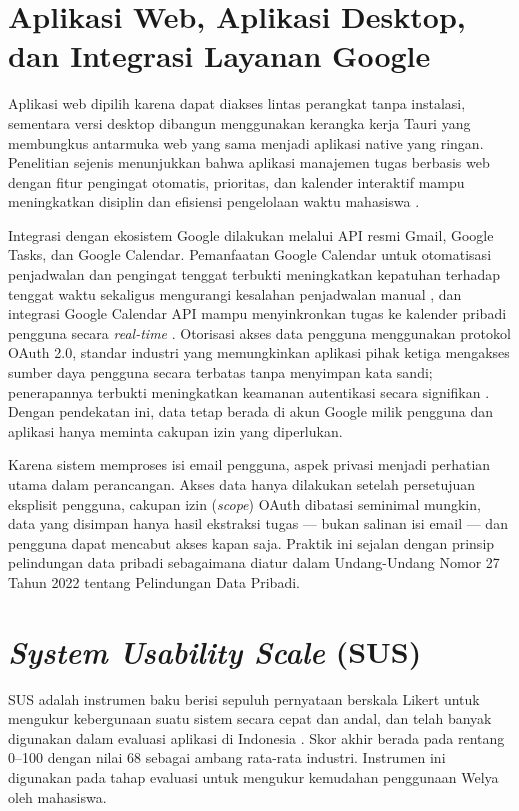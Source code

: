 \section{Aplikasi Web, Aplikasi Desktop, dan Integrasi Layanan Google}
Aplikasi web dipilih karena dapat diakses lintas perangkat tanpa
instalasi, sementara versi desktop dibangun menggunakan kerangka kerja
Tauri yang membungkus antarmuka web yang sama menjadi aplikasi native
yang ringan. Penelitian sejenis menunjukkan bahwa aplikasi manajemen tugas
berbasis web dengan fitur pengingat otomatis, prioritas, dan kalender
interaktif mampu meningkatkan disiplin dan efisiensi pengelolaan waktu
mahasiswa \parencite{panjaitan2025}.

Integrasi dengan ekosistem Google dilakukan melalui API resmi Gmail,
Google Tasks, dan Google Calendar. Pemanfaatan Google Calendar untuk
otomatisasi penjadwalan dan pengingat tenggat terbukti meningkatkan
kepatuhan terhadap tenggat waktu sekaligus mengurangi kesalahan
penjadwalan manual \parencite{setiawan2025}, dan integrasi Google Calendar
API mampu menyinkronkan tugas ke kalender pribadi pengguna secara
\emph{real-time} \parencite{moedjahedy2025}. Otorisasi akses data pengguna
menggunakan protokol OAuth 2.0, standar industri yang memungkinkan
aplikasi pihak ketiga mengakses sumber daya pengguna secara terbatas
tanpa menyimpan kata sandi; penerapannya terbukti meningkatkan keamanan
autentikasi secara signifikan \parencite{arianto2025}. Dengan pendekatan ini,
data
tetap berada di akun Google milik pengguna dan aplikasi hanya meminta
cakupan izin yang diperlukan.

Karena sistem memproses isi email pengguna, aspek privasi menjadi
perhatian utama dalam perancangan. Akses data hanya dilakukan setelah
persetujuan eksplisit pengguna, cakupan izin (\emph{scope}) OAuth
dibatasi seminimal mungkin, data yang disimpan hanya hasil ekstraksi
tugas --- bukan salinan isi email --- dan pengguna dapat mencabut akses
kapan saja. Praktik ini sejalan dengan prinsip pelindungan data pribadi
sebagaimana diatur dalam Undang-Undang Nomor 27 Tahun 2022 tentang
Pelindungan Data Pribadi.

\section{\emph{System Usability Scale} (SUS)}
SUS adalah instrumen baku berisi sepuluh pernyataan berskala Likert untuk
mengukur kebergunaan suatu sistem secara cepat dan andal, dan telah
banyak digunakan dalam evaluasi aplikasi di Indonesia \parencite{dyayu2023}.
Skor akhir berada pada rentang 0--100 dengan nilai 68 sebagai ambang
rata-rata industri. Instrumen ini digunakan pada tahap evaluasi untuk
mengukur kemudahan penggunaan Welya oleh mahasiswa.

